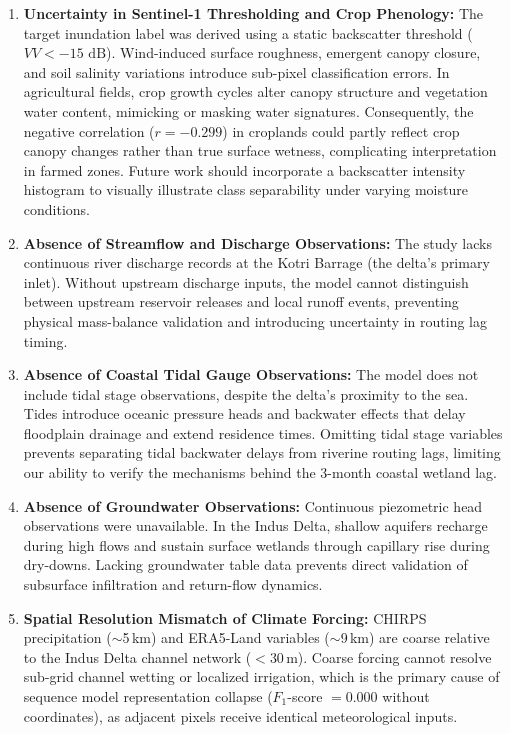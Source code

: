 \begin{enumerate}
    \item \textbf{Uncertainty in Sentinel-1 Thresholding and Crop Phenology:} The target inundation label was derived using a static backscatter threshold ($VV < -15\text{ dB}$). Wind-induced surface roughness, emergent canopy closure, and soil salinity variations introduce sub-pixel classification errors. In agricultural fields, crop growth cycles alter canopy structure and vegetation water content, mimicking or masking water signatures. Consequently, the negative correlation ($r = -0.299$) in croplands could partly reflect crop canopy changes rather than true surface wetness, complicating interpretation in farmed zones. Future work should incorporate a backscatter intensity histogram to visually illustrate class separability under varying moisture conditions.
    \item \textbf{Absence of Streamflow and Discharge Observations:} The study lacks continuous river discharge records at the Kotri Barrage (the delta's primary inlet). Without upstream discharge inputs, the model cannot distinguish between upstream reservoir releases and local runoff events, preventing physical mass-balance validation and introducing uncertainty in routing lag timing.
    \item \textbf{Absence of Coastal Tidal Gauge Observations:} The model does not include tidal stage observations, despite the delta's proximity to the sea. Tides introduce oceanic pressure heads and backwater effects that delay floodplain drainage and extend residence times. Omitting tidal stage variables prevents separating tidal backwater delays from riverine routing lags, limiting our ability to verify the mechanisms behind the 3-month coastal wetland lag.
    \item \textbf{Absence of Groundwater Observations:} Continuous piezometric head observations were unavailable. In the Indus Delta, shallow aquifers recharge during high flows and sustain surface wetlands through capillary rise during dry-downs. Lacking groundwater table data prevents direct validation of subsurface infiltration and return-flow dynamics.
    \item \textbf{Spatial Resolution Mismatch of Climate Forcing:} CHIRPS precipitation ($\sim$5\,km) and ERA5-Land variables ($\sim$9\,km) are coarse relative to the Indus Delta channel network ($<$30\,m). Coarse forcing cannot resolve sub-grid channel wetting or localized irrigation, which is the primary cause of sequence model representation collapse ($F_1$-score $= 0.000$ without coordinates), as adjacent pixels receive identical meteorological inputs.

\end{enumerate}
